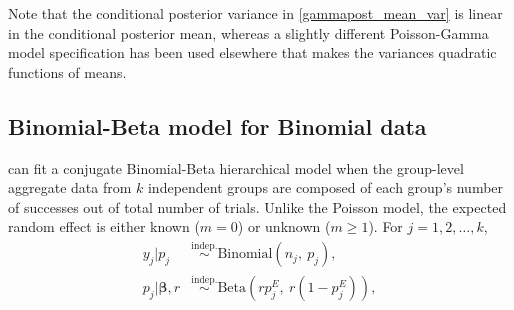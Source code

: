 \documentclass[article]{jss}
\begin{document}
Note that the conditional posterior variance in  \eqref{gammapost_mean_var} is linear in the conditional posterior mean, whereas a slightly different Poisson-Gamma model specification has been used elsewhere \citep{morris1997} that makes the variances  quadratic functions of means.  


\subsection[Binomial-Beta]{Binomial-Beta model for Binomial data}
 can fit a conjugate Binomial-Beta hierarchical model when the group-level aggregate data from $k$ independent  groups are composed of each group's number of successes out of total number of trials. Unlike the Poisson model, the expected random effect is either known ($m=0$) or unknown ($m\ge1$). For $j=1, 2, \ldots, k$,
\begin{align}
y_{j} \vert p_{j} &\stackrel{\textrm{indep.}}{\sim} \textrm{Binomial}(n_{j}, ~p_{j}),\\
p_{j} \vert \boldsymbol{\beta}, r &\stackrel{\textrm{indep.}}{\sim} \textrm{Beta}(rp^E_j,~ r(1-p^E_j)),
\end{align}
\end{document}
